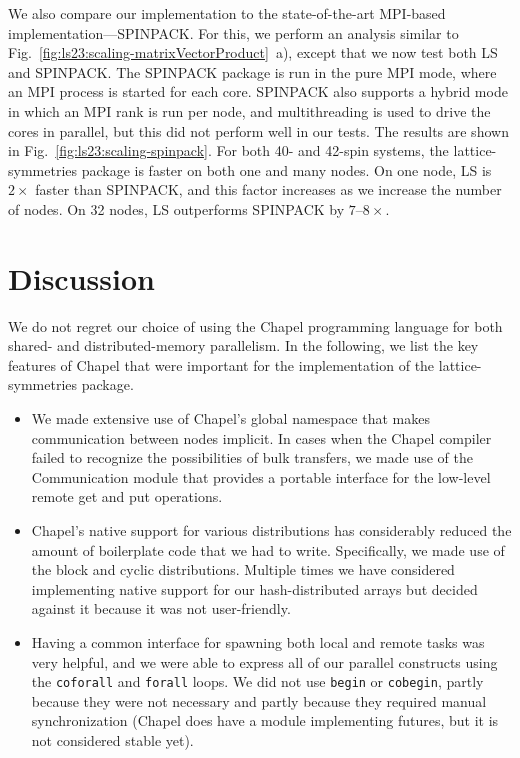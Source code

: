 We also compare our implementation to the state-of-the-art MPI-based implementation---SPINPACK. For this, we perform an analysis similar to Fig.~\ref{fig:ls23:scaling-matrixVectorProduct}~a), except that we now test both LS and SPINPACK. The SPINPACK package is run in the pure MPI mode, where an MPI process is started for each core. SPINPACK also supports a hybrid mode in which an MPI rank is run per node, and multithreading is used to drive the cores in parallel, but this did not perform well in our tests. The results are shown in Fig.~\ref{fig:ls23:scaling-spinpack}. For both 40- and 42-spin systems, the lattice-symmetries package is faster on both one and many nodes. On one node, LS is $2\times$ faster than SPINPACK, and this factor increases as we increase the number of nodes. On 32 nodes, LS outperforms SPINPACK by $7$--$8\times$.

\section{Discussion}\label{sec:ls23:discussion}

We do not regret our choice of using the Chapel programming language for both shared- and distributed-memory parallelism. In the following, we list the key features of Chapel that were important for the implementation of the lattice-symmetries package.
\begin{itemize}[topsep=0pt,noitemsep]
  \item We made extensive use of Chapel's global namespace that makes communication between nodes implicit. In cases when the Chapel compiler failed to recognize the possibilities of bulk transfers, we made use of the Communication module that provides a portable interface for the low-level remote get and put operations.
  \item Chapel's native support for various distributions has considerably reduced the amount of boilerplate code that we had to write. Specifically, we made use of the block and cyclic distributions. Multiple times we have considered implementing native support for our hash-distributed arrays but decided against it because it was not user-friendly.
  \item Having a common interface for spawning both local and remote tasks was very helpful, and we were able to express all of our parallel constructs using the \verb|coforall| and \verb|forall| loops. We did not use \verb|begin| or \verb|cobegin|, partly because they were not necessary and partly because they required manual synchronization (Chapel does have a module implementing futures, but it is not considered stable yet).
\end{itemize}

